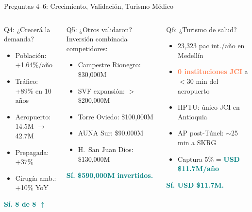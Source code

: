 \documentclass[aspectratio=169, 11pt]{beamer}
\newcommand{\highlight}[1]{\textcolor{teal}{\textbf{#1}}}
\newcommand{\danger}[1]{\textcolor{coral}{\textbf{#1}}}
\newcommand{\src}[1]{\par\vspace{2pt}{\tiny\textcolor{slate}{Fuente: #1}}}
\begin{document}
\begin{frame}{Preguntas 4--6: Crecimiento, Validación, Turismo Médico}

\begin{columns}[T]
\begin{block}{\small Q4: ¿Crecerá la demanda?}
\scriptsize
\begin{itemize}\setlength{\itemsep}{1pt}
  \item Población: +1.64\%/año
  \item Tráfico: +89\% en 10 años
  \item Aeropuerto: 14.5M $\to$ 42.7M
  \item Prepagada: +37\%
  \item Cirugía amb.: +10\% YoY
\end{itemize}
\vspace{3pt}
\centering\highlight{Sí. 8 de 8 $\uparrow$}
\end{block}

\begin{block}{\small Q5: ¿Otros validaron?}
\scriptsize
Inversión combinada competidores:
\begin{itemize}\setlength{\itemsep}{1pt}
  \item Campestre Rionegro: \$30,000M
  \item SVF expansión: $>$\$200,000M
  \item Torre Oviedo: \$100,000M
  \item AUNA Sur: \$90,000M
  \item H.\ San Juan Dios: \$130,000M
\end{itemize}
\vspace{3pt}
\centering\highlight{Sí. \$590,000M invertidos.}
\end{block}

\begin{block}{\small Q6: ¿Turismo de salud?}
\scriptsize
\begin{itemize}\setlength{\itemsep}{1pt}
  \item 23,323 pac int./año en Medellín
  \item \danger{0 instituciones JCI} a $<$30 min del aeropuerto
  \item HPTU: único JCI en Antioquia
  \item AP post-Túnel: $\sim$25 min a SKRG
  \item Captura 5\% = \highlight{USD \$11.7M/año}
\end{itemize}
\vspace{3pt}
\centering\highlight{Sí. USD \$11.7M.}
\end{block}
\end{columns}

\src{DANE, MEData, Aerocivil, REPS, ProColombia, JCI Directory}
\end{frame}
\end{document}
